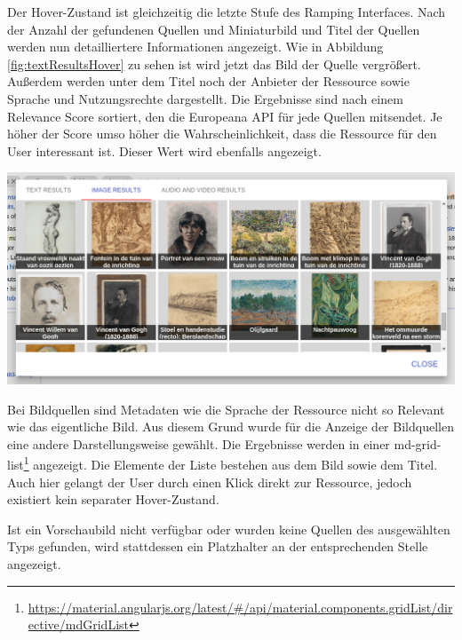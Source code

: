  Der Hover-Zustand ist gleichzeitig die letzte Stufe des Ramping Interfaces. Nach der Anzahl der gefundenen Quellen und Miniaturbild und Titel der Quellen werden nun detailliertere Informationen angezeigt. Wie in Abbildung \ref{fig:textResultsHover} zu sehen ist wird jetzt das Bild der Quelle vergrößert. Außerdem werden unter dem Titel noch der Anbieter der Ressource sowie Sprache und Nutzungsrechte dargestellt. Die Ergebnisse sind nach einem Relevance Score sortiert, den die Europeana API für jede Quellen mitsendet. Je höher der Score umso höher die Wahrscheinlichkeit, dass die Ressource für den User interessant ist. Dieser Wert wird ebenfalls angezeigt. 

 \begin{minipage}{\linewidth}
	\centering
	\vspace*{0.5cm}
	\includegraphics[width=\linewidth]{Bilder/app-screenshots/image-results.png}
	\label{fig:imageResults}
	\vspace*{0.5cm}
 \end{minipage}

 Bei Bildquellen sind Metadaten wie die Sprache der Ressource nicht so Relevant wie das eigentliche Bild. Aus diesem Grund wurde für die Anzeige der Bildquellen eine andere Darstellungsweise gewählt. Die Ergebnisse werden in einer md-grid-list\footnote{\url{https://material.angularjs.org/latest/\#/api/material.components.gridList/directive/mdGridList}} angezeigt. Die Elemente der Liste bestehen aus dem Bild sowie dem Titel. Auch hier gelangt der User durch einen Klick direkt zur Ressource, jedoch existiert kein separater Hover-Zustand.

 Ist ein Vorschaubild nicht verfügbar oder wurden keine Quellen des ausgewählten Typs gefunden, wird stattdessen ein Platzhalter an der entsprechenden Stelle angezeigt.

